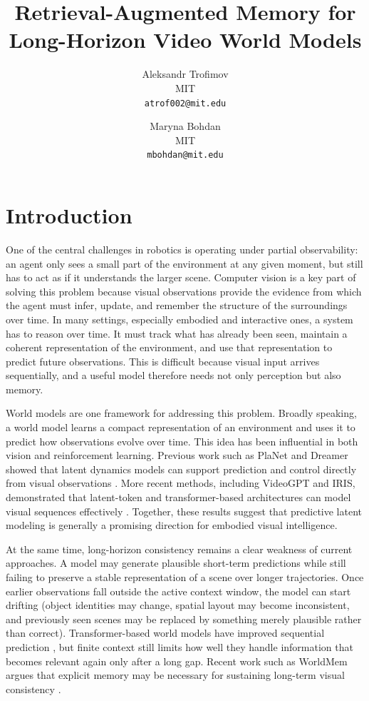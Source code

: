 \documentclass[10pt,twocolumn,letterpaper]{article}
\begin{document}
\title{Retrieval-Augmented Memory for Long-Horizon Video World Models}

\author{
Aleksandr Trofimov\\
MIT\\
{\tt\small atrof002@mit.edu}
\and
Maryna Bohdan\\
MIT\\
{\tt\small mbohdan@mit.edu}
}

\maketitle

\section{Introduction}
One of the central challenges in robotics is operating under partial
observability: an agent only sees a small part of the environment at any given
moment, but still has to act as if it understands the larger scene. Computer
vision is a key part of solving this problem because visual observations provide
the evidence from which the agent must infer, update, and remember the structure
of the surroundings over time. In many settings, especially embodied and
interactive ones, a system has to reason over time. It must track what has
already been seen, maintain a coherent representation of the environment, and
use that representation to predict future observations. This is difficult
because visual input arrives sequentially, and a useful model therefore needs
not only perception but also memory.

World models are one framework for addressing this problem. Broadly speaking, a
world model learns a compact representation of an environment and uses it to
predict how observations evolve over time. This idea has been influential in
both vision and reinforcement learning. Previous work such as PlaNet and Dreamer
showed that latent dynamics models can support prediction and control directly
from visual observations \cite{hafner2019planet,hafner2020dreamer}. More recent
methods, including VideoGPT and IRIS, demonstrated that latent-token and
transformer-based architectures can model visual sequences effectively
\cite{yan2021videogpt,micheli2023iris}. Together, these results suggest that
predictive latent modeling is generally a promising direction for embodied
visual intelligence.

At the same time, long-horizon consistency remains a clear weakness of current
approaches. A model may generate plausible short-term predictions while still
failing to preserve a stable representation of a scene over longer trajectories.
Once earlier observations fall outside the active context window, the model can
start drifting (object identities may change, spatial layout may become
inconsistent, and previously seen scenes may be replaced by something merely
plausible rather than correct). Transformer-based world models have improved
sequential prediction \cite{chen2022transdreamer}, but finite context still
limits how well they handle information that becomes relevant again only after a
long gap. Recent work such as WorldMem argues that explicit memory may be
necessary for sustaining long-term visual consistency \cite{xiao2025worldmem}.
\end{document}
